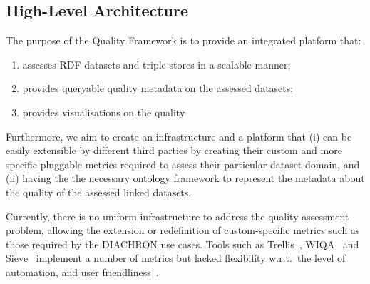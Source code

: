 
\subsection{High-Level Architecture}
\label{sec:HLA} 

The purpose of the Quality Framework is to provide an integrated platform that: 
\begin{enumerate}
\item assesses RDF datasets and triple stores in a scalable manner;
\item provides queryable quality metadata on the assessed datasets;
\item provides visualisations on the quality 
\end{enumerate}
Furthermore, we aim to create an infrastructure and a platform that (i) can be easily extensible by different third parties by creating their custom and more specific pluggable metrics required to assess their particular dataset domain, and (ii) having the the necessary ontology framework to represent the metadata about the quality of the assessed linked datasets.

Currently, there is no uniform infrastructure to address the quality assessment problem, allowing the extension or redefinition of custom-specific metrics such as those required by the DIACHRON use cases.
Tools such as Trellis~\cite{Gil2002}, WIQA~\cite{Bizer2008:PhDThesis:biblatex} and Sieve~\cite{Mendes2012} implement a number of metrics but lacked flexibility w.r.t.\ the level of automation, and user friendliness~\cite{Zaveri2013}. 

